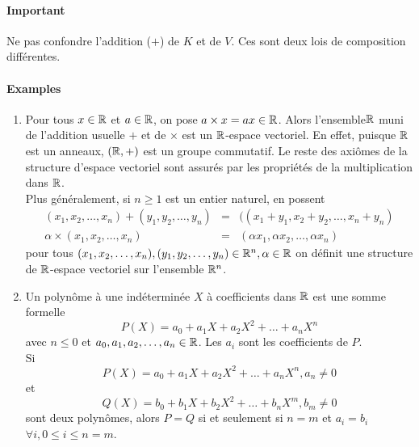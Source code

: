 \paragraph{Important} Ne pas confondre l'addition ($+$) de $K$ et de $V$. Ces sont deux lois de composition différentes.

\paragraph{Examples}
\begin{enumerate}
  \item Pour tous $x \in \mathbb{R}$ et $a\in \mathbb{R}$, on pose $a \times x = a x \in \mathbb{R}$. Alors l'ensemble$\mathbb{R}$ muni de l'addition usuelle $+$ et de $\times$ est un $\mathbb{R}$-espace vectoriel. En effet, puisque $\mathbb{R}$ est un anneaux, $(\mathbb{R}, +)$ est un groupe commutatif. Le reste des axiômes de la structure d'espace vectoriel sont assurés par les propriétés de la multiplication dans $\mathbb{R}$. \\
    Plus généralement, si $n \geq 1$ est un entier naturel, en possent
    \begin{eqnarray*}
      (x_1, x_2, \ldots, x_n) + (y_1, y_2, \ldots, y_n) &=& ((x_1+y_1, x_2+y_2, \ldots, x_n+y_n) \\
      \alpha \times (x_1, x_2, \ldots, x_n) &=& (\alpha x_1, \alpha x_2, \ldots, \alpha x_n)
    \end{eqnarray*}
    pour tous $(x_1, x_2, \ldots, x_n), (y_1, y_2, \ldots, y_n) \in \mathbb{R}^n, \alpha \in \mathbb{R}$ on définit une structure de $\mathbb{R}$-espace vectoriel sur l'ensemble $\mathbb{R}^n$.
    
  \item Un polynôme à une indéterminée $X$ à coefficients dans $\mathbb{R}$ est une somme formelle 
    $$P(X) = a_0 + a_1 X + a_2 X^2 + \ldots + a_n X^{n}$$ 
    avec $n \leq 0$ et $a_0, a_1, a_2, \ldots, a_n \in \mathbb{R}$. Les $a_i$ sont les coefficients de $P$. \\
    Si 
    $$P(X) = a_0 + a_1 X + a_2 X^2 + \ldots + a_n X^{n}, a_n \neq 0$$ 
    et 
    $$Q(X) = b_0 + b_1 X + b_2 X^2 + \ldots + b_n X^{m}, b_m \neq 0$$ 
    sont deux polynômes, alors $P=Q$ si et seulement si $n=m$ et $a_i = b_i$  $\forall i, 0 \leq i \leq n = m$. \\
    

\end{enumerate}
